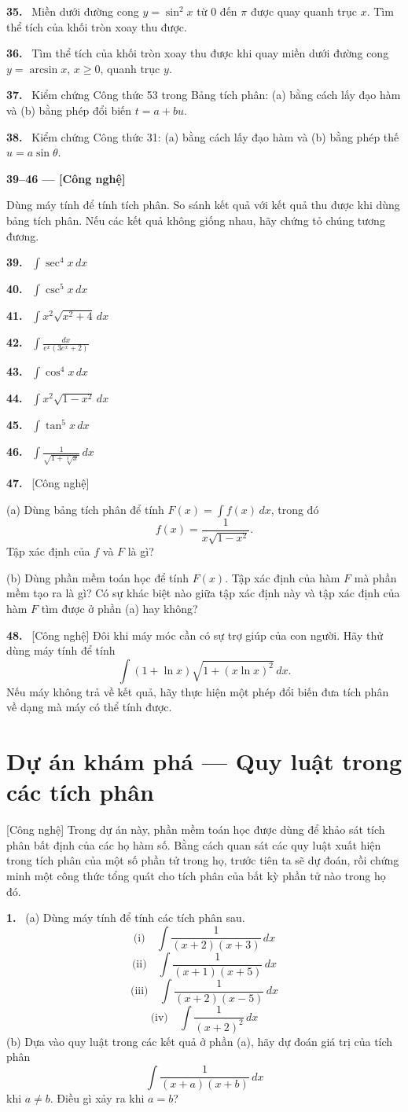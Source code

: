 \documentclass[12pt,a4paper]{article}
\newcommand{\bt}[1]{\par\smallskip\Needspace{5\baselineskip}\noindent\textbf{#1.}\ }
\newcommand{\group}[1]{\par\Needspace{11\baselineskip}\medskip\noindent\textbf{#1}\par\nopagebreak[4]}
\newcommand{\prj}[1]{\bt{#1}}
\begin{document}
\bt{35} Miền dưới đường cong $y=\sin^2x$ từ $0$ đến $\pi$ được quay quanh trục $x$. Tìm thể tích của khối tròn xoay thu được.
\bt{36} Tìm thể tích của khối tròn xoay thu được khi quay miền dưới đường cong $y=\arcsin x$, $x\ge0$, quanh trục $y$.
\bt{37} Kiểm chứng Công thức 53 trong Bảng tích phân: (a) bằng cách lấy đạo hàm và (b) bằng phép đổi biến $t=a+bu$.
\bt{38} Kiểm chứng Công thức 31: (a) bằng cách lấy đạo hàm và (b) bằng phép thế $u=a\sin\theta$.
\group{39–46 — [Công nghệ]}
Dùng máy tính để tính tích phân. So sánh kết quả với kết quả thu được khi dùng bảng tích phân. Nếu các kết quả không giống nhau, hãy chứng tỏ chúng tương đương.
\bt{39} $\displaystyle \int\sec^4x\,dx$
\bt{40} $\displaystyle \int\csc^5x\,dx$
\bt{41} $\displaystyle \int x^2\sqrt{x^2+4}\,dx$
\bt{42} $\displaystyle \int\frac{dx}{e^x(3e^x+2)}$
\bt{43} $\displaystyle \int\cos^4x\,dx$
\bt{44} $\displaystyle \int x^2\sqrt{1-x^2}\,dx$
\bt{45} $\displaystyle \int\tan^5x\,dx$
\bt{46} $\displaystyle \int\frac1{\sqrt{1+\sqrt[3]{x}}}\,dx$

\bt{47} [Công nghệ]

(a) Dùng bảng tích phân để tính $F(x)=\int f(x)\,dx$, trong đó
\[f(x)=\frac1{x\sqrt{1-x^2}}.\]
Tập xác định của $f$ và $F$ là gì?

(b) Dùng phần mềm toán học để tính $F(x)$. Tập xác định của hàm $F$ mà phần mềm tạo ra là gì? Có sự khác biệt nào giữa tập xác định này và tập xác định của hàm $F$ tìm được ở phần (a) hay không?

\bt{48} [Công nghệ] Đôi khi máy móc cần có sự trợ giúp của con người. Hãy thử dùng máy tính để tính
\[\int(1+\ln x)\sqrt{1+(x\ln x)^2}\,dx.\]
Nếu máy không trả về kết quả, hãy thực hiện một phép đổi biến đưa tích phân về dạng mà máy có thể tính được.

\clearpage
\section*{Dự án khám phá — Quy luật trong các tích phân}
[Công nghệ] Trong dự án này, phần mềm toán học được dùng để khảo sát tích phân bất định của các họ hàm số. Bằng cách quan sát các quy luật xuất hiện trong tích phân của một số phần tử trong họ, trước tiên ta sẽ dự đoán, rồi chứng minh một công thức tổng quát cho tích phân của bất kỳ phần tử nào trong họ đó.

\prj{1} (a) Dùng máy tính để tính các tích phân sau.
\[\text{(i)}\quad\int\frac1{(x+2)(x+3)}\,dx\]
\[\text{(ii)}\quad\int\frac1{(x+1)(x+5)}\,dx\]
\[\text{(iii)}\quad\int\frac1{(x+2)(x-5)}\,dx\]
\[\text{(iv)}\quad\int\frac1{(x+2)^2}\,dx\]
(b) Dựa vào quy luật trong các kết quả ở phần (a), hãy dự đoán giá trị của tích phân
\[\int\frac1{(x+a)(x+b)}\,dx\]
khi $a\ne b$. Điều gì xảy ra khi $a=b$?
\end{document}
